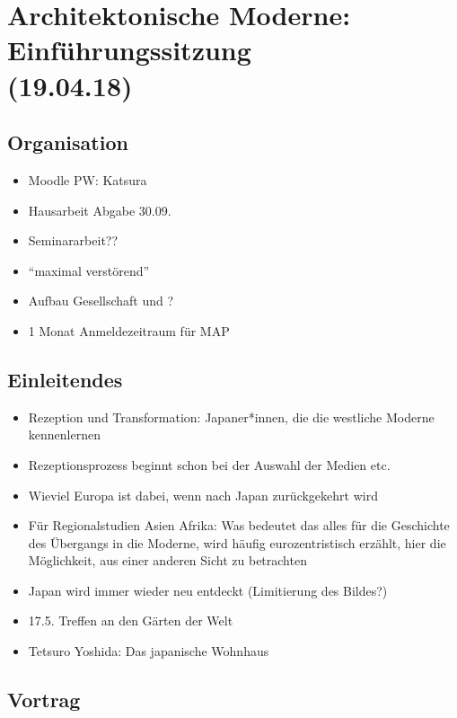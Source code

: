 \documentclass[emulatestandardclasses]{scrartcl}
\begin{document}
\tableofcontents
\newpage


\section{Architektonische Moderne: Einführungssitzung\\(19.04.18)}

\subsection{Organisation}

\begin{itemize}
  \item Moodle PW: Katsura
  \item Hausarbeit Abgabe 30.09.
  \item Seminararbeit??
  \item "`maximal verstörend"'
  \item Aufbau Gesellschaft und ?
  \item 1 Monat Anmeldezeitraum für MAP
\end{itemize}

\subsection{Einleitendes}

\begin{itemize}
  \item Rezeption und Transformation: Japaner*innen, die die westliche Moderne kennenlernen
  \item Rezeptionsprozess beginnt schon bei der Auswahl der Medien etc. 
  \item Wieviel Europa ist dabei, wenn nach Japan zurückgekehrt wird
  \item Für Regionalstudien Asien Afrika: Was bedeutet das alles für die Geschichte des Übergangs in die Moderne, wird häufig eurozentristisch erzählt, hier die Möglichkeit, aus einer anderen Sicht zu betrachten
  \item Japan wird immer wieder neu entdeckt (Limitierung des Bildes?)
  \item 17.5. Treffen an den Gärten der Welt
  \item Tetsuro Yoshida: Das japanische Wohnhaus
\end{itemize}

\subsection{Vortrag}
\end{document}
